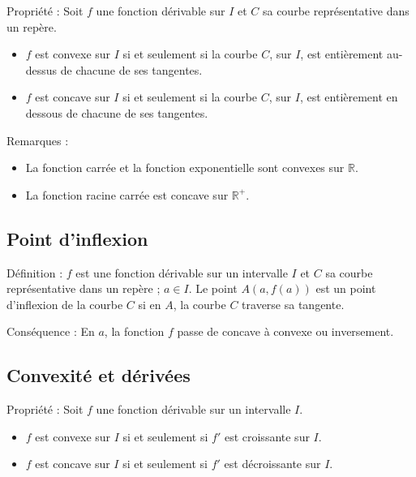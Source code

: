 \documentclass[11pt,a4paper]{article}
\begin{document}
\begin{boiteProp}{Propriété :}
    Soit $f$ une fonction dérivable sur $I$ et $C$ sa courbe représentative dans un repère.
    \begin{itemize}
        \item $f$ est convexe sur $I$ si et seulement si la courbe $C$, sur $I$, est entièrement au-dessus de chacune de ses tangentes.
        \item $f$ est concave sur $I$ si et seulement si la courbe $C$, sur $I$, est entièrement en dessous de chacune de ses tangentes.
    \end{itemize}
\end{boiteProp}

\begin{boiteRemarque}{Remarques :}
    \begin{itemize}
        \item La fonction carrée et la fonction exponentielle sont convexes sur $\mathbb{R}$.
        \item La fonction racine carrée est concave sur $\mathbb{R}^+$.
    \end{itemize}
\end{boiteRemarque}

\subsection{Point d'inflexion}

\begin{boiteDef}{Définition :}
    $f$ est une fonction dérivable sur un intervalle $I$ et $C$ sa courbe représentative dans un repère ; $a \in I$.
    \newline
    Le point $A(a, f(a))$ est un point d'inflexion de la courbe $C$ si en $A$, la courbe $C$ traverse sa tangente.
\end{boiteDef}

\begin{boiteRemarque}{Conséquence :}
    En $a$, la fonction $f$ passe de concave à convexe ou inversement.    
\end{boiteRemarque}

\subsection{Convexité et dérivées}

\begin{boiteProp}{Propriété :}
    Soit $f$ une fonction dérivable sur un intervalle $I$.
    \begin{itemize}
        \item $f$ est convexe sur $I$ si et seulement si $f'$ est croissante sur $I$.
        \item $f$ est concave sur $I$ si et seulement si $f'$ est décroissante sur $I$.
    \end{itemize}
\end{boiteProp}
\end{document}
